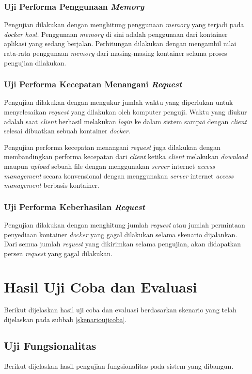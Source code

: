\subsubsection{Uji Performa Penggunaan \textit{Memory}}
Pengujian dilakukan dengan menghitung penggunaan \textit{memory} yang terjadi pada \textit{docker host}. Penggunaan \textit{memory} di sini adalah penggunaan dari kontainer aplikasi yang sedang berjalan. Perhitungan dilakukan dengan mengambil nilai rata-rata penggunaan \textit{memory} dari masing-masing kontainer selama proses pengujian dilakukan.

\subsubsection{Uji Performa Kecepatan Menangani \textit{Request}}
Pengujian dilakukan dengan mengukur jumlah waktu yang diperlukan untuk menyelesaikan \textit{request} yang dilakukan oleh komputer penguji. Waktu yang diukur adalah saat \textit{client} berhasil melakukan \textit{login} ke dalam sistem sampai dengan \textit{client} selesai dibuatkan sebuah kontainer \textit{docker}.

Pengujian performa kecepatan menangani \textit{request} juga dilakukan dengan membandingkan performa kecepatan dari \textit{client} ketika \textit{client} melakukan \textit{download} maupun \textit{upload} sebuah file dengan menggunakan \textit{server} internet \textit{access management} secara konvensional dengan menggunakan \textit{server} internet \textit{access management} berbasis kontainer.

\subsubsection{Uji Performa Keberhasilan \textit{Request}}
Pengujian dilakukan dengan menghitung jumlah \textit{request} atau jumlah permintaan penyediaan kontainer \textit{docker} yang gagal dilakukan selama skenario dijalankan. Dari semua jumlah \textit{request} yang dikirimkan selama pengujian, akan didapatkan persen \textit{request} yang gagal dilakukan.
    
\section{Hasil Uji Coba dan Evaluasi}
Berikut dijelaskan hasil uji coba dan evaluasi berdasarkan skenario yang telah dijelaskan pada subbab \ref{skenarioujicoba}.
    
\subsection{Uji Fungsionalitas}
Berikut dijelaskan hasil pengujian fungsionalitas pada sistem yang dibangun.

